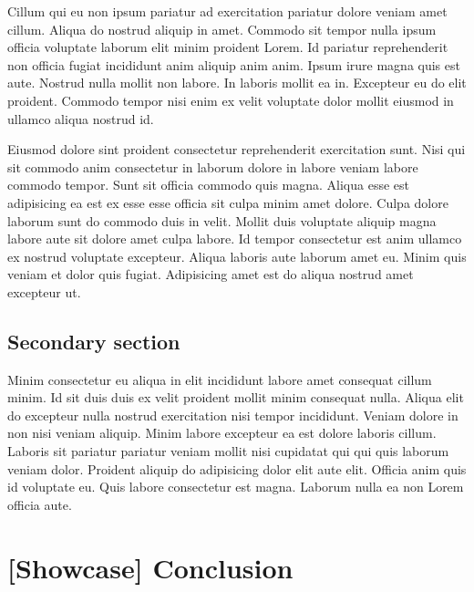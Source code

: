 \documentclass[
12pt,
openright,
oneside,
a4paper,
chapter=TITLE,
section=TITLE,
french,
spanish,
brazil,
english
]{abntex2}\usepackage{array}
\begin{document}
Cillum qui eu non ipsum pariatur ad exercitation pariatur dolore veniam
amet cillum. Aliqua do nostrud aliquip in amet. Commodo sit tempor nulla
ipsum officia voluptate laborum elit minim proident Lorem. Id pariatur
reprehenderit non officia fugiat incididunt anim aliquip anim anim.
Ipsum irure magna quis est aute. Nostrud nulla mollit non labore. In
laboris mollit ea in. Excepteur eu do elit proident. Commodo tempor nisi
enim ex velit voluptate dolor mollit eiusmod in ullamco aliqua nostrud
id.

Eiusmod dolore sint proident consectetur reprehenderit exercitation
sunt. Nisi qui sit commodo anim consectetur in laborum dolore in labore
veniam labore commodo tempor. Sunt sit officia commodo quis magna.
Aliqua esse est adipisicing ea est ex esse esse officia sit culpa minim
amet dolore. Culpa dolore laborum sunt do commodo duis in velit. Mollit
duis voluptate aliquip magna labore aute sit dolore amet culpa labore.
Id tempor consectetur est anim ullamco ex nostrud voluptate excepteur.
Aliqua laboris aute laborum amet eu. Minim quis veniam et dolor quis
fugiat. Adipisicing amet est do aliqua nostrud amet excepteur ut.

\hypertarget{secondary-section-1}{%
\section{Secondary section}\label{secondary-section-1}}

Minim consectetur eu aliqua in elit incididunt labore amet consequat
cillum minim. Id sit duis duis ex velit proident mollit minim consequat
nulla. Aliqua elit do excepteur nulla nostrud exercitation nisi tempor
incididunt. Veniam dolore in non nisi veniam aliquip. Minim labore
excepteur ea est dolore laboris cillum. Laboris sit pariatur pariatur
veniam mollit nisi cupidatat qui qui quis laborum veniam dolor. Proident
aliquip do adipisicing dolor elit aute elit. Officia anim quis id
voluptate eu. Quis labore consectetur est magna. Laborum nulla ea non
Lorem officia aute.


\hypertarget{showcase-conclusion}{%
\chapter{{[}Showcase{]} Conclusion}\label{showcase-conclusion}}
\end{document}
